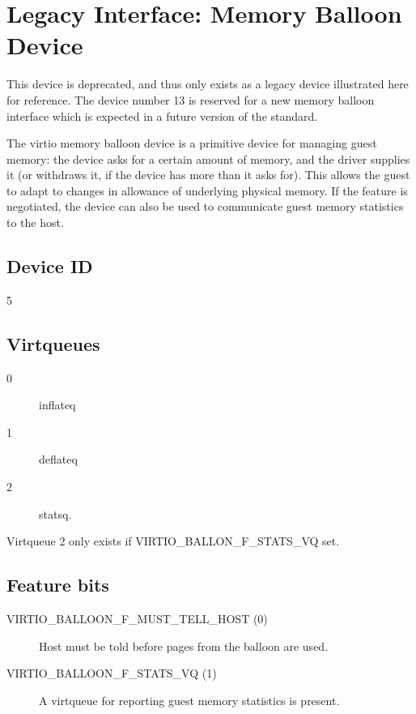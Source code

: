 \section{Legacy Interface: Memory Balloon Device}\label{sec:Device Types / Memory Balloon Device}

This device is deprecated, and thus only exists as a legacy device
illustrated here for reference.  The device number 13 is reserved for
a new memory balloon interface which is expected in a future version
of the standard.

The virtio memory balloon device is a primitive device for
managing guest memory: the device asks for a certain amount of
memory, and the driver supplies it (or withdraws it, if the device
has more than it asks for). This allows the guest to adapt to
changes in allowance of underlying physical memory. If the
feature is negotiated, the device can also be used to communicate
guest memory statistics to the host.

\subsection{Device ID}\label{sec:Device Types / Memory Balloon Device / Device ID}
  5

\subsection{Virtqueues}\label{sec:Device Types / Memory Balloon Device / Virtqueues}
\begin{description}
\item[0] inflateq
\item[1] deflateq
\item[2] statsq.
\end{description}

  Virtqueue 2 only exists if VIRTIO_BALLON_F_STATS_VQ set.

\subsection{Feature bits}\label{sec:Device Types / Memory Balloon Device / Feature bits}
\begin{description}
\item[VIRTIO_BALLOON_F_MUST_TELL_HOST (0)] Host must be told before
    pages from the balloon are used.

\item[VIRTIO_BALLOON_F_STATS_VQ (1)] A virtqueue for reporting guest
    memory statistics is present.
\end{description}

